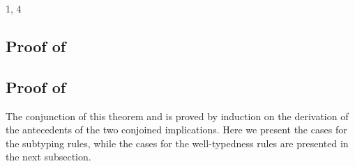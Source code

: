 \begin{bycase}
\Case{\Rterec}
\begin{derivation}
\step{\cxwfO}{\premof{\Rterec}}
\end{derivation}

\Case{\Rterestr}
\begin{derivation}
\step{\istyO{\tsubO}}{\premof{\Rterestr}}
\end{derivation}

\Case{\Rterecord}
\begin{derivation}
\step{\istyO{\trecO}}{\premof{\Rterecord}}
     {1, 4}
\end{derivation}

\end{bycase}



\subsection*{Proof of }

\begin{derivation}
\step{\hastyO{\expr}{\typ}}{\hyp}
\end{derivation}



\subsection*{Proof of }

The conjunction of this theorem and  is proved by
induction on the derivation of the antecedents of the two conjoined
implications. Here we present the cases for the subtyping rules, while the
cases for the well-typedness rules are presented in the next subsection.

